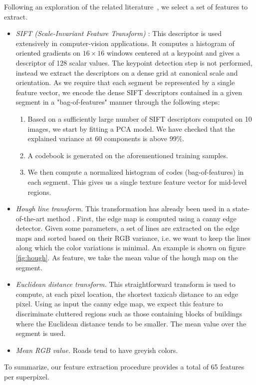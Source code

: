 \documentclass[10pt,conference,compsocconf]{IEEEtran}
\begin{document}
Following an exploration of the related literature~\cite{fulkerson09}, we select a set of features to extract.
\begin{itemize}
\item\emph{SIFT (Scale-Invariant Feature Transform) \cite{lowe04}}: This descriptor is used extensively in computer-vision applications. It computes a histogram of oriented gradients on $16 \times 16$ windows centered at a keypoint and gives a descriptor of 128 scalar values. The keypoint detection step is not performed, instead we extract the descriptors on a dense grid at canonical scale and orientation. As we require that each segment be represented by a single feature vector, we encode the dense SIFT descriptors contained in a given segment in a "bag-of-features" manner through the following steps: 
\begin{enumerate}
\item Based on a sufficiently large number of SIFT descriptors computed on 10 images, we start by fitting a PCA model. We have checked that the explained variance at 60 components is above 99\%.
\item A codebook is generated on the aforementioned training samples. 
\item We then compute a normalized histogram of codes (bag-of-features) in each segment. This gives us a single texture feature vector for mid-level regions.
\end{enumerate}
\item \emph{Hough line transform.} This transformation has already been used in a state-of-the-art method \cite{2016ISPAr41B3..891L}. First, the edge map is computed using a canny edge detector\cite{canny1986computational}. Given some parameters, a set of lines are extracted on the edge maps and sorted based on their RGB variance, i.e. we want to keep the lines along which the color variations is minimal. An example is shown on figure \ref{fig:hough}. As feature, we take the mean value of the hough map on the segment.
\item \emph{Euclidean distance transform.} This straightforward transform is used to compute, at each pixel location, the shortest taxicab distance to an edge pixel. Using as input the canny edge map, we expect this feature to discriminate cluttered regions such as those containing blocks of buildings where the Euclidean distance tends to be smaller. The mean value over the segment is used.
\item \emph{Mean RGB value.} Roads tend to have greyish colors.
\end{itemize}
To summarize, our feature extraction procedure provides a total of 65 features
per superpixel.
\end{document}
